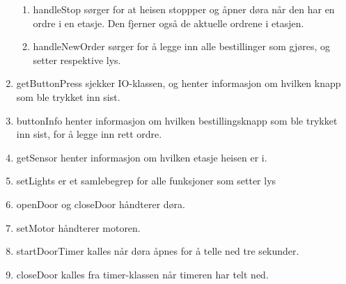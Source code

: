 \begin{enumerate}
\begin{enumerate}
	\item handleStop sørger for at heisen stoppper og åpner døra når den har en ordre i en etasje. Den fjerner også de aktuelle ordrene i etasjen.
	\item handleNewOrder sørger for å legge inn alle bestillinger som gjøres, og setter respektive lys.
	\end{enumerate}
\item getButtonPress sjekker IO-klassen, og henter informasjon om hvilken knapp som ble trykket inn sist.
\item buttonInfo henter informasjon om hvilken bestillingsknapp som ble trykket inn sist, for å legge inn rett ordre.
\item getSensor henter informasjon om hvilken etasje heisen er i.
\item setLights er et samlebegrep for alle funksjoner som setter lys
\item openDoor og closeDoor håndterer døra.
\item setMotor håndterer motoren.
\item startDoorTimer kalles når døra åpnes for å telle ned tre sekunder.
\item closeDoor kalles fra timer-klassen når timeren har telt ned.
\end{enumerate}

